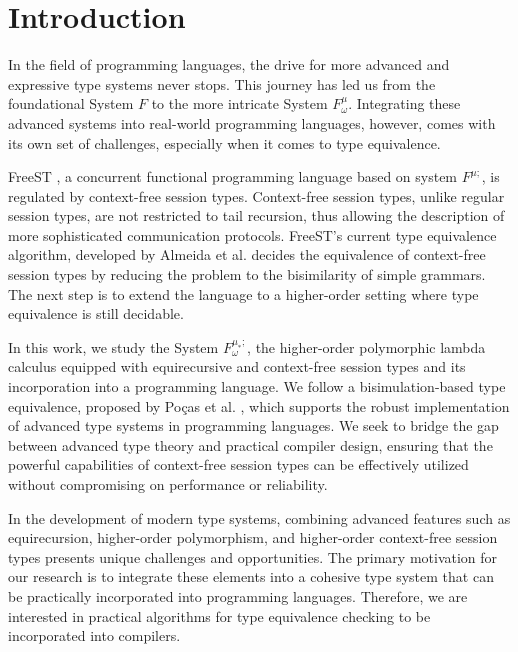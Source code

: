 \section{Introduction}
In the field of programming languages, the drive for more advanced and expressive type systems never stops. This journey has led us from the foundational System $F$\cite{DBLP:conf/programm/Reynolds74} to the more intricate System $F^{\mu}_\omega$\cite{DBLP:conf/popl/CaiGO16}. Integrating these advanced systems into real-world programming languages, however, comes with its own set of challenges, especially when it comes to type equivalence.

FreeST \cite{AlmeidaMTV22}, a concurrent functional programming language based on system $F^{\mu;}$, is regulated by context-free session types. Context-free session types, unlike regular session types, are not restricted to tail recursion, thus allowing the description of more sophisticated communication protocols. FreeST's current type equivalence algorithm, developed by Almeida et al. \cite{AlmeidaMV20} decides the equivalence of context-free session types by reducing the problem to the bisimilarity of simple grammars. The next step is to extend the language to a higher-order setting where type equivalence is still decidable.


In this work, we study the System $F^{\mu_*;}_\omega$, the higher-order polymorphic lambda calculus equipped with equirecursive and context-free session types and its incorporation into a programming language. We follow a bisimulation-based type equivalence, proposed by Poças et al. \cite{PocasCMV23}, which supports the robust implementation of advanced type systems in programming languages. We seek to bridge the gap between advanced type theory and practical compiler design, ensuring that the powerful capabilities of context-free session types can be effectively utilized without compromising on performance or reliability.

In the development of modern type systems, combining advanced features such as equirecursion, higher-order polymorphism, and higher-order context-free session types presents unique challenges and opportunities. The primary motivation for our research is to integrate these elements into a cohesive type system that can be practically incorporated into programming languages. Therefore, we are interested in practical algorithms for type equivalence checking to be incorporated into compilers.

